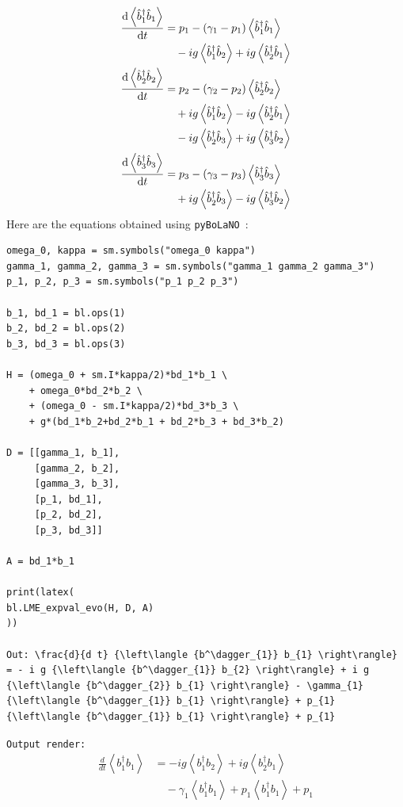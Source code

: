 \documentclass[5p, twocolumn, 10pt, sort&compress]{elsarticle}
\newcommand{\inlinecode}[1]{\texttt{#1}}
\newcommand{\expval}[1]{\left\langle{#1}\right\rangle}
\newcommand{\bop}{\hat{b}}
\newcommand{\bdag}{\bop^\dagger}
\newcommand{\pybolano}{\texttt{pyBoLaNO}~}
\newenvironment{revision2}{%
\color{red}
}
{}
\begin{document}
\begin{subequations}
\begin{align}
    \begin{split}
        \odv{\expval{\bdag_1\bop_1}}{t}
        &= p_1-\left(\gamma_1-p_1\right)\expval{\bdag_1\bop_1}
        \\ 
        &\quad -ig\expval{\bdag_1\bop_2}+ig\expval{\bdag_2\bop_1}
    \end{split}
    \\
    \begin{split}
    \odv{\expval{\bdag_2\bop_2}}{t} 
    &= 
    p_2 - \left(\gamma_2-p_2\right)\expval{\bdag_2\bop_2}
    \\ 
    &\quad +ig\expval{\bdag_1\bop_2}  -ig \expval{\bdag_2\bop_1}
    \\ 
    &\quad - ig\expval{\bdag_2\bop_3} + ig\expval{\bdag_3\bop_2}
    \end{split}
    \\
    \begin{split}
    \odv{\expval{\bdag_3\bop_3}}{t} 
    &= 
    p_3 - \left(\gamma_3-p_3\right) \expval{\bdag_3\bop_3}
    \\ 
    &\quad +ig\expval{\bdag_2\bop_3} - ig\expval{\bdag_3\bop_2}
    \end{split}
\end{align}
\end{subequations}
Here are the equations obtained using \pybolano:
\begin{verbatim}
omega_0, kappa = sm.symbols("omega_0 kappa")
gamma_1, gamma_2, gamma_3 = sm.symbols("gamma_1 gamma_2 gamma_3")
p_1, p_2, p_3 = sm.symbols("p_1 p_2 p_3")

b_1, bd_1 = bl.ops(1)
b_2, bd_2 = bl.ops(2)
b_3, bd_3 = bl.ops(3)

H = (omega_0 + sm.I*kappa/2)*bd_1*b_1 \
    + omega_0*bd_2*b_2 \
    + (omega_0 - sm.I*kappa/2)*bd_3*b_3 \
    + g*(bd_1*b_2+bd_2*b_1 + bd_2*b_3 + bd_3*b_2)
    
D = [[gamma_1, b_1],
     [gamma_2, b_2],
     [gamma_3, b_3],
     [p_1, bd_1],
     [p_2, bd_2],
     [p_3, bd_3]]

A = bd_1*b_1

print(latex(
bl.LME_expval_evo(H, D, A)
))

Out: \frac{d}{d t} {\left\langle {b^\dagger_{1}} b_{1} \right\rangle} = - i g {\left\langle {b^\dagger_{1}} b_{2} \right\rangle} + i g {\left\langle {b^\dagger_{2}} b_{1} \right\rangle} - \gamma_{1} {\left\langle {b^\dagger_{1}} b_{1} \right\rangle} + p_{1} {\left\langle {b^\dagger_{1}} b_{1} \right\rangle} + p_{1}
\end{verbatim}
\begin{revision2}
\noindent\inlinecode{Output render:}
\begin{align*}
\frac{d}{d t} {\left\langle {b^\dagger_{1}} b_{1} \right\rangle} &= - i g {\left\langle {b^\dagger_{1}} b_{2} \right\rangle} + i g {\left\langle {b^\dagger_{2}} b_{1} \right\rangle} \\&\quad - \gamma_{1} {\left\langle {b^\dagger_{1}} b_{1} \right\rangle} + p_{1} {\left\langle {b^\dagger_{1}} b_{1} \right\rangle} + p_{1}
\end{align*}
\end{revision2}
\end{document}
